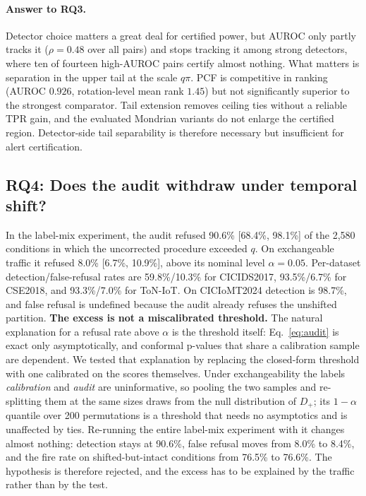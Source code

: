 \documentclass[a4paper,fleqn]{cas-dc}
\begin{document}
\paragraph{Answer to RQ3.} Detector choice matters a great deal for certified power, but AUROC only partly tracks it ($\rho=0.48$ over all pairs) and stops tracking it among strong detectors, where ten of fourteen high-AUROC pairs certify almost nothing. What matters is separation in the upper tail at the scale $q\pi$. PCF is competitive in ranking (AUROC $0.926$, rotation-level mean rank $1.45$) but not significantly superior to the strongest comparator. Tail extension removes ceiling ties without a reliable TPR gain, and the evaluated Mondrian variants do not enlarge the certified region. Detector-side tail separability is therefore necessary but insufficient for alert certification.

\subsection{RQ4: Does the audit withdraw under temporal shift?}
\label{sec:rq4}
In the label-mix experiment, the audit refused 90.6\% [68.4\%, 98.1\%] of the 2,580 conditions in which the uncorrected procedure exceeded $q$. On exchangeable traffic it refused 8.0\% [6.7\%, 10.9\%], above its nominal level $\alpha=0.05$. Per-dataset detection/false-refusal rates are 59.8\%/10.3\% for CICIDS2017, 93.5\%/6.7\% for CSE2018, and 93.3\%/7.0\% for ToN-IoT. On CICIoMT2024 detection is 98.7\%, and false refusal is undefined because the audit already refuses the unshifted partition. \textbf{The excess is not a miscalibrated threshold.} The natural explanation for a refusal rate above $\alpha$ is the threshold itself: Eq.~\eqref{eq:audit} is exact only asymptotically, and conformal p-values that share a calibration sample are dependent. We tested that explanation by replacing the closed-form threshold with one calibrated on the scores themselves. Under exchangeability the labels \emph{calibration} and \emph{audit} are uninformative, so pooling the two samples and re-splitting them at the same sizes draws from the null distribution of $D_+$; its $1-\alpha$ quantile over 200 permutations is a threshold that needs no asymptotics and is unaffected by ties. Re-running the entire label-mix experiment with it changes almost nothing: detection stays at 90.6\%, false refusal moves from 8.0\% to 8.4\%, and the fire rate on shifted-but-intact conditions from 76.5\% to 76.6\%. The hypothesis is therefore rejected, and the excess has to be explained by the traffic rather than by the test.
\end{document}
